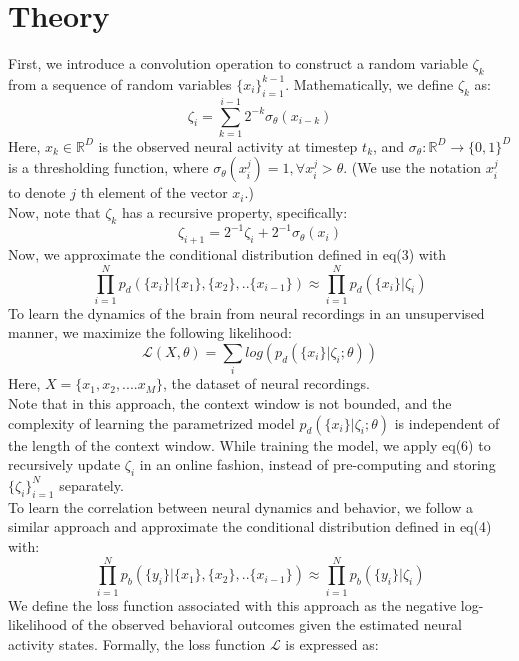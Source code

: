 \section{Theory}

First, we introduce a convolution operation to construct a random variable $ \zeta_k $ from a sequence of random variables $\{x_i\}_{i=1}^{k- 1}$. Mathematically, we define $ \zeta_k $ as:
\begin{equation}
    \zeta_i = \sum_{k=1}^{i-1} 2^{-k} \sigma_{\theta}(x_{i-k}) 
\end{equation}
Here, $x_k \in \mathbb{R}^D$ is the observed neural activity at timestep $t_k$, and $\sigma_{\theta}: \mathbb{R}^D \rightarrow \{0,1\}^D $ is a thresholding function, where $\sigma_{\theta}(x_i^{j}) = 1, \forall x_i^{j} > \theta $. (We use the notation $x_i^{j}$ to denote $j$ th element of the vector $x_i$.)
\\

Now, note that $\zeta_k $ has a recursive property, specifically:
\begin{equation}
    \zeta_{i+1} = 2^{-1}\zeta_i +  2^{-1}\sigma_{\theta}(x_i)
\end{equation}
Now, we approximate the conditional distribution defined in eq(3) with 
\begin{equation}
   \prod_{i=1}^{N} p_d(\{x_{i}\}| \{x_1\},\{x_2\},..\{x_{i-1}\}) 
   \approx  \prod_{i=1}^{N} p_d(\{x_{i}\}|\zeta_i)
\end{equation}
To learn the dynamics of the brain from neural recordings in an unsupervised manner, we maximize the following likelihood:
\begin{equation}
    \mathcal{L}(X,\theta) = \sum_i log(p_d(\{x_{i}\}|\zeta_i;\theta))
\end{equation}
Here, $X = \{x_1,x_2,....x_M\}$, the dataset of neural recordings. \\

Note that in this approach, the context window is not bounded, and the complexity of learning the parametrized model $p_d(\{x_{i}\}|\zeta_i;\theta)$ is independent of the length of the context window. While training the model, we apply eq(6) to recursively update $\zeta_i$ in an online fashion, instead of pre-computing and storing $\{\zeta_i\}_{i=1}^N$ separately.
 \\

 To learn the correlation between neural dynamics and behavior, we follow a similar approach and approximate the conditional distribution defined in eq(4) with:
\\
 \begin{equation}
   \prod_{i=1}^{N} p_b(\{y_{i}\}| \{x_1\},\{x_2\},..\{x_{i-1}\}) 
   \approx  \prod_{i=1}^{N} p_b(\{y_{i}\}|\zeta_i)
\end{equation}
We define the loss function associated with this approach as the negative log-likelihood of the observed behavioral outcomes given the estimated neural activity states. Formally, the loss function \( \mathcal{L} \) is expressed as:

